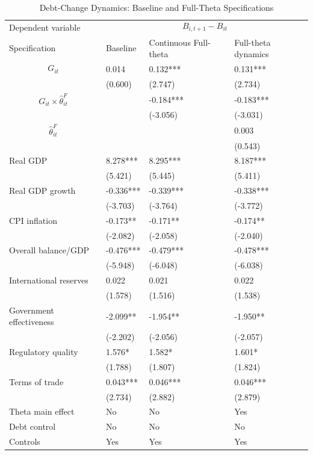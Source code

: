 \begin{table}[H]\centering
\begin{threeparttable}
\caption{Debt-Change Dynamics: Baseline and Full-Theta Specifications}
\label{tab:debt_change_combined_fulltheta}
\scriptsize
\begin{tabularx}{\textwidth}{lYYY}
\toprule
Dependent variable &  \\
\cmidrule(lr){2-4}
Specification & Baseline & Continuous Full-theta & Full-theta dynamics \\
\midrule
$$G_{it}$$ & 0.014 & 0.132*** & 0.131*** \\
 & (0.600) & (2.747) & (2.734) \\
$$G_{it}\times\widehat{\theta}^{F}_{it}$$ &  & -0.184*** & -0.183*** \\
 &  & (-3.056) & (-3.031) \\
$$\widehat{\theta}^{F}_{it}$$ &  &  & 0.003 \\
 &  &  & (0.543) \\
Real GDP & 8.278*** & 8.295*** & 8.187*** \\
 & (5.421) & (5.445) & (5.411) \\
Real GDP growth & -0.336*** & -0.339*** & -0.338*** \\
 & (-3.703) & (-3.764) & (-3.772) \\
CPI inflation & -0.173** & -0.171** & -0.174** \\
 & (-2.082) & (-2.058) & (-2.040) \\
Overall balance/GDP & -0.476*** & -0.479*** & -0.478*** \\
 & (-5.948) & (-6.048) & (-6.038) \\
International reserves & 0.022 & 0.021 & 0.022 \\
 & (1.578) & (1.516) & (1.538) \\
Government effectiveness & -2.099** & -1.954** & -1.950** \\
 & (-2.202) & (-2.056) & (-2.057) \\
Regulatory quality & 1.576* & 1.582* & 1.601* \\
 & (1.788) & (1.807) & (1.824) \\
Terms of trade & 0.043*** & 0.046*** & 0.046*** \\
 & (2.734) & (2.882) & (2.879) \\
\midrule
Theta main effect & No & No & Yes \\
Debt control & No & No & No \\
Controls & Yes & Yes & Yes \\

\end{tabularx}
\end{threeparttable}
\end{table}
